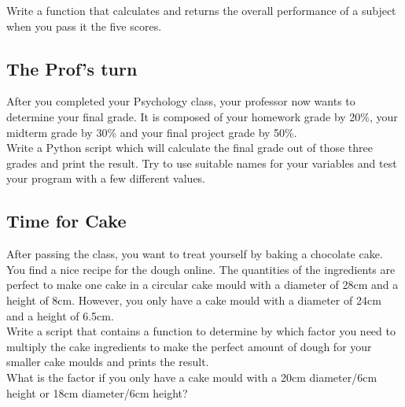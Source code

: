 Write a function that calculates and returns the overall performance of a subject when you pass it the five scores.
\cprotect{}

\subsection{The Prof's turn}
After you completed your Psychology class, your professor now wants to determine your final grade.
It is composed of your homework grade by 20\%, your midterm grade by 30\% and your final
project grade by 50\%.\\
Write a Python script which will calculate the final grade out of those three grades
and print the result. Try to use suitable names for your variables and test your program with
a few different values.

\cprotect{}

\subsection{Time for Cake}
After passing the class, you want to treat yourself by baking a chocolate cake.
You find a nice recipe for the dough online.
The quantities of the ingredients are perfect to make one cake in a circular cake mould with a diameter
of 28cm and a height of 8cm. However, you only have a cake mould with a diameter of 24cm and a height of 6.5cm.\\
Write a script that contains a function to determine by which factor you need to multiply the cake ingredients
to make the perfect amount of dough for your smaller cake moulds and prints the result.\\
What is the factor if you only have a cake mould with a 20cm diameter/6cm height or 18cm diameter/6cm height?

\cprotect{}

